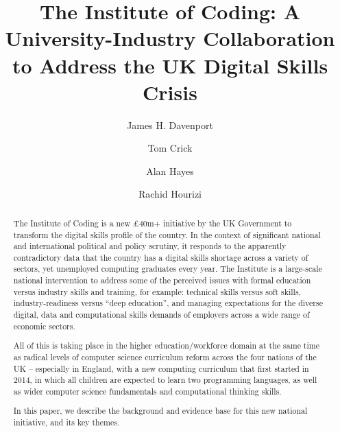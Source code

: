 \documentclass[sigconf,anonymous]{acmart}
\begin{document}
\title{The Institute of Coding: A University-Industry Collaboration to Address the UK Digital Skills Crisis}
\author{James H. Davenport}

\author{Tom Crick}

\author{Alan Hayes}

\author{Rachid Hourizi}
 

\renewcommand{\shortauthors}{Davenport, Crick, Hayes and Hourizi}


\begin{abstract}
The Institute of Coding is a new \pounds40m+ initiative by the UK
Government to transform the digital skills profile of the country. In
the context of significant national and international political and
policy scrutiny, it responds to the apparently contradictory data that
the country has a digital skills shortage across a variety of sectors,
yet unemployed computing graduates every year. The Institute is a
large-scale national intervention to address some of the perceived
issues with formal education versus industry skills and training, for
example: technical skills versus soft skills, industry-readiness
versus ``deep education'', and managing expectations for the diverse
digital, data and computational skills demands of employers across a
wide range of economic sectors.

All of this is taking place in the higher education/workforce domain
at the same time as radical levels of computer science curriculum
reform across the four nations of the UK -- especially in England,
with a new computing curriculum that first started in 2014, in which
all children are expected to learn two programming languages, as well
as wider computer science fundamentals and computational thinking
skills.

In this paper, we describe the background and evidence base for this
new national initiative, and its key themes.
\end{abstract}
\end{document}
